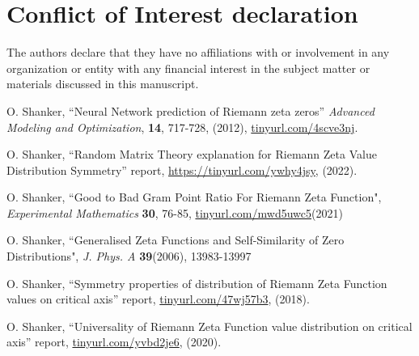 \documentclass[twoside]{article}
\begin{document}
\section*{Conflict of Interest declaration} 

The authors declare that they have no affiliations with or involvement in any organization 
or entity with any financial interest in the subject matter or materials discussed 
in this manuscript.



\begin{thebibliography}{10}

 O. Shanker, ``Neural Network prediction of Riemann zeta zeros''
{\it Advanced Modeling and Optimization}, {\bf 14}, 717-728, (2012), \url{tinyurl.com/4scve3nj}.


 O. Shanker, 
``Random Matrix Theory explanation for Riemann Zeta Value Distribution Symmetry''
 report,
\url{https://tinyurl.com/ywhy4jsy}, 
(2022). 


 O. Shanker, 
``Good to Bad Gram Point Ratio For Riemann Zeta Function",
{\it Experimental Mathematics} {\bf 30}, 76-85,
\url{tinyurl.com/mwd5uwc5}(2021)

 O. Shanker, 
``Generalised Zeta Functions and Self-Similarity of Zero Distributions",
{\it J.  Phys. A} {\bf39}(2006), 13983-13997

 O. Shanker, 
``Symmetry properties of distribution of Riemann Zeta Function values on critical axis''
 report,
\url{tinyurl.com/47wj57b3}, 
(2018). 

 O. Shanker, 
``Universality of Riemann Zeta Function value distribution on critical axis''
 report,
\url{tinyurl.com/yvbd2je6}, 
(2020). 




\end{thebibliography} 
\end{document}
